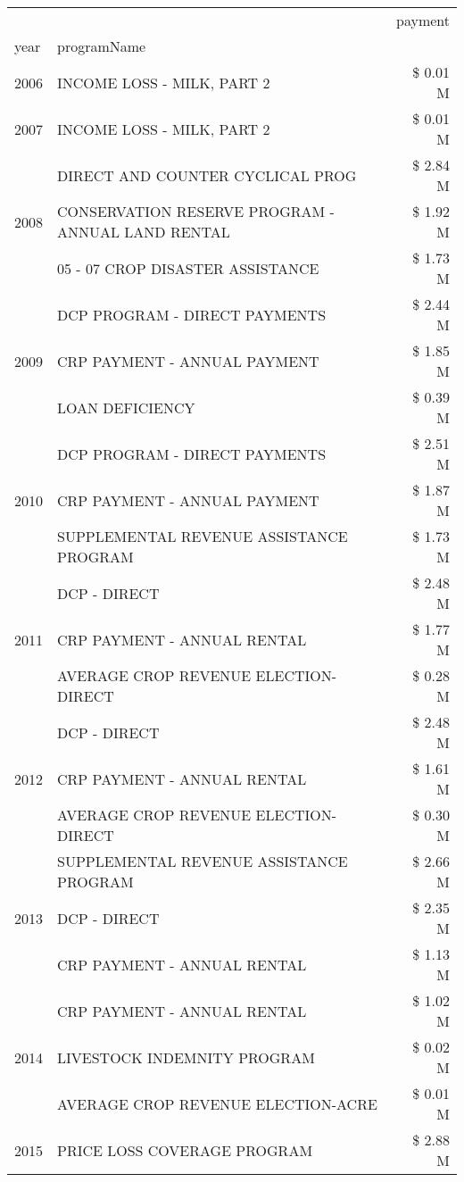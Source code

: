 \begin{tabular}{llr}
\toprule
 &  & payment \\
year & programName &  \\
\midrule
2006 & INCOME LOSS - MILK, PART 2 & \$ 0.01 M \\
\cline{1-3}
2007 & INCOME LOSS - MILK, PART 2 & \$ 0.01 M \\
\cline{1-3}
\multirow[t]{3}{*}{2008} & DIRECT AND COUNTER CYCLICAL PROG & \$ 2.84 M \\
 & CONSERVATION RESERVE PROGRAM - ANNUAL LAND RENTAL & \$ 1.92 M \\
 & 05 - 07 CROP DISASTER ASSISTANCE & \$ 1.73 M \\
\cline{1-3}
\multirow[t]{3}{*}{2009} & DCP PROGRAM - DIRECT PAYMENTS & \$ 2.44 M \\
 & CRP PAYMENT - ANNUAL PAYMENT & \$ 1.85 M \\
 & LOAN DEFICIENCY & \$ 0.39 M \\
\cline{1-3}
\multirow[t]{3}{*}{2010} & DCP PROGRAM - DIRECT PAYMENTS & \$ 2.51 M \\
 & CRP PAYMENT - ANNUAL PAYMENT & \$ 1.87 M \\
 & SUPPLEMENTAL REVENUE ASSISTANCE PROGRAM & \$ 1.73 M \\
\cline{1-3}
\multirow[t]{3}{*}{2011} & DCP - DIRECT & \$ 2.48 M \\
 & CRP PAYMENT - ANNUAL RENTAL & \$ 1.77 M \\
 & AVERAGE CROP REVENUE ELECTION-DIRECT & \$ 0.28 M \\
\cline{1-3}
\multirow[t]{3}{*}{2012} & DCP - DIRECT & \$ 2.48 M \\
 & CRP PAYMENT - ANNUAL RENTAL & \$ 1.61 M \\
 & AVERAGE CROP REVENUE ELECTION-DIRECT & \$ 0.30 M \\
\cline{1-3}
\multirow[t]{3}{*}{2013} & SUPPLEMENTAL REVENUE ASSISTANCE PROGRAM & \$ 2.66 M \\
 & DCP - DIRECT & \$ 2.35 M \\
 & CRP PAYMENT - ANNUAL RENTAL & \$ 1.13 M \\
\cline{1-3}
\multirow[t]{3}{*}{2014} & CRP PAYMENT - ANNUAL RENTAL & \$ 1.02 M \\
 & LIVESTOCK INDEMNITY PROGRAM & \$ 0.02 M \\
 & AVERAGE CROP REVENUE ELECTION-ACRE & \$ 0.01 M \\
\cline{1-3}
\multirow[t]{3}{*}{2015} & PRICE LOSS COVERAGE PROGRAM & \$ 2.88 M \\

\end{tabular}
